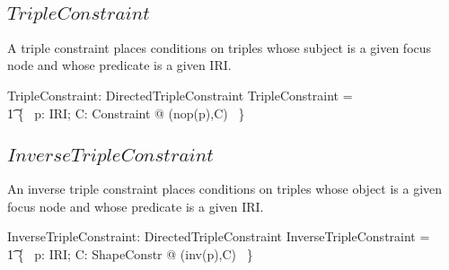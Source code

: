 \documentclass{article}
\begin{document}
\subsection{$TripleConstraint$}
A triple constraint places conditions on triples whose subject is a given focus node
and whose predicate is a given IRI.
\begin{axdef}
	TripleConstraint: \power DirectedTripleConstraint
\where
	TripleConstraint = \\
\t1		\{~ p: IRI; C: Constraint @ (nop(p),C) ~\}
\end{axdef}

\subsection{$InverseTripleConstraint$}
An inverse triple constraint places conditions on triples whose object is a given focus node
and whose predicate is a given IRI.
\begin{axdef}
	InverseTripleConstraint: \power DirectedTripleConstraint
\where
	InverseTripleConstraint = \\
\t1		\{~ p: IRI; C: ShapeConstr @ (inv(p),C) ~\}
\end{axdef}
\end{document}
